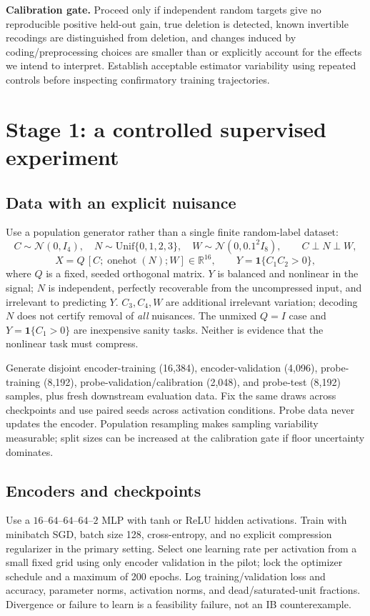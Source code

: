 \documentclass[11pt,a4paper]{article}
\begin{document}
\textbf{Calibration gate.} Proceed only if independent random targets give no reproducible positive held-out gain, true deletion is detected, known invertible recodings are distinguished from deletion, and changes induced by coding/preprocessing choices are smaller than or explicitly account for the effects we intend to interpret. Establish acceptable estimator variability using repeated controls before inspecting confirmatory training trajectories.

\section{Stage 1: a controlled supervised experiment}

\subsection{Data with an explicit nuisance}
Use a population generator rather than a single finite random-label dataset:
\[
C\sim\mathcal N(0,I_4),\quad N\sim\mathrm{Unif}\{0,1,2,3\},\quad
W\sim\mathcal N(0,0.1^2 I_8),\qquad C\perp N\perp W,
\]
\begin{equation}
X=Q\,[C;\operatorname{onehot}(N);W]\in\mathbb R^{16},
\qquad Y=\mathbf1\{C_1C_2>0\},
\label{eq:data}
\end{equation}
where $Q$ is a fixed, seeded orthogonal matrix. $Y$ is balanced and nonlinear in the signal; $N$ is independent, perfectly recoverable from the uncompressed input, and irrelevant to predicting $Y$. $C_3,C_4,W$ are additional irrelevant variation; decoding $N$ does not certify removal of \emph{all} nuisances. The unmixed $Q=I$ case and $Y=\mathbf1\{C_1>0\}$ are inexpensive sanity tasks. Neither is evidence that the nonlinear task must compress.

Generate disjoint encoder-training (16,384), encoder-validation (4,096), probe-training (8,192), probe-validation/calibration (2,048), and probe-test (8,192) samples, plus fresh downstream evaluation data. Fix the same draws across checkpoints and use paired seeds across activation conditions. Probe data never updates the encoder. Population resampling makes sampling variability measurable; split sizes can be increased at the calibration gate if floor uncertainty dominates.

\subsection{Encoders and checkpoints}
Use a $16$--$64$--$64$--$64$--$2$ MLP with tanh or ReLU hidden activations. Train with minibatch SGD, batch size 128, cross-entropy, and no explicit compression regularizer in the primary setting. Select one learning rate per activation from a small fixed grid using only encoder validation in the pilot; lock the optimizer schedule and a maximum of 200 epochs. Log training/validation loss and accuracy, parameter norms, activation norms, and dead/saturated-unit fractions. Divergence or failure to learn is a feasibility failure, not an IB counterexample.
\end{document}
